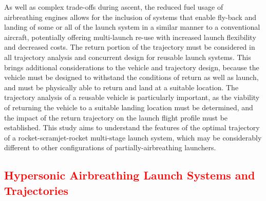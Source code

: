 As well as complex trade-offs during ascent, the reduced fuel usage of airbreathing engines allows for the inclusion of systems that enable fly-back and landing of some or all of the launch system in a similar manner to a conventional aircraft, potentially offering multi-launch re-use with increased launch flexibility and decreased costs\cite{Preller2017b}. The return portion of the trajectory must be considered in all trajectory analysis and concurrent design for reusable launch systems. This brings additional considerations to the vehicle and trajectory design, because the vehicle must be designed to withstand the conditions of return as well as launch, and must be physically able to return and land at a suitable location. The trajectory analysis of a reusable vehicle is particularly important, as the viability of returning the vehicle to a suitable landing location must be determined, and the impact of the return trajectory on the launch flight profile must be established. 
	This study aims to understand the features of the optimal trajectory of a rocket-scramjet-rocket multi-stage launch system, which may be considerably different to other configurations of partially-airbreathing launchers. 


    \textcolor{red}{
  \section{Hypersonic Airbreathing Launch Systems and Trajectories}\label{sec:AscentTrajectories}
}
 
  
    
